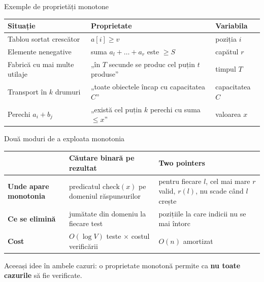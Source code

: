 \documentclass[8pt,mathserif]{beamer}
\begin{document}
\begin{frame}{Exemple de proprietăți monotone}
  \renewcommand{\arraystretch}{1.35}
  \begin{tabular}{@{}p{}p{}p{}@{}}
    \toprule
    \textbf{Situație} & \textbf{Proprietate} & \textbf{Variabila} \\
    \midrule
    Tablou sortat crescător & $a[i] \ge v$ & poziția $i$ \\
    Elemente nenegative & suma $a_l + \dots + a_r$ este $\ge S$ & capătul $r$ \\
    Fabrică cu mai multe utilaje & „în $T$ secunde se produc cel puțin $t$ produse” & timpul $T$ \\
    Transport în $k$ drumuri & „toate obiectele încap cu capacitatea $C$” & capacitatea $C$ \\
    Perechi $a_i + b_j$ & „există cel puțin $k$ perechi cu suma $\le x$” & valoarea $x$ \\
    \bottomrule
  \end{tabular}
\end{frame}

\begin{frame}{Două moduri de a exploata monotonia}
  \renewcommand{\arraystretch}{1.4}
  \begin{tabular}{@{}p{}p{}p{}@{}}
    \toprule
     & \textbf{Căutare binară pe rezultat} & \textbf{Two pointers} \\
    \midrule
    \textbf{Unde apare monotonia} & predicatul $\mathrm{check}(x)$ pe domeniul răspunsurilor & pentru fiecare $l$, cel mai mare $r$ valid, $r(l)$, nu scade când $l$ crește \\
    \textbf{Ce se elimină} & jumătate din domeniu la fiecare test & pozițiile la care indicii nu se mai întorc \\
    \textbf{Cost} & $O(\log V)$ teste $\times$ costul verificării & $O(n)$ amortizat \\
    \bottomrule
  \end{tabular}
  \smallskip

  Aceeași idee în ambele cazuri: o proprietate monotonă permite ca \textbf{nu toate cazurile} să fie verificate.
\end{frame}
\end{document}
